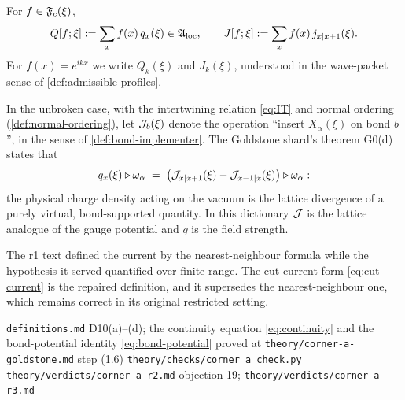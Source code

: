 \begin{definition}
\label{def:modulated-charge}
For $f \in \mathfrak{F}_{c}(\xi)$,
\begin{equation}
  Q[f;\xi] := \sum_{x} f(x) \, q_{x}(\xi) \in \mathfrak{A}_{\mathrm{loc}},
  \qquad
  J[f;\xi] := \sum_{x} f(x) \, j_{x|x+1}(\xi) .
\end{equation}
For $f(x) = e^{ikx}$ we write $Q_{k}(\xi)$ and $J_{k}(\xi)$, understood in the
wave-packet sense of \cref{def:admissible-profiles}.
\end{definition}

\begin{definition}
\label{def:bond-current-potential}
In the unbroken case, with the intertwining relation \eqref{eq:IT} and normal
ordering (\cref{def:normal-ordering}), let $\mathcal{J}_{b}(\xi)$ denote the
operation ``insert $X_{\alpha}(\xi)$ on bond $b$'', in the sense of
\cref{def:bond-implementer}. The Goldstone shard's theorem G0(d) states that
\begin{equation}
  q_{x}(\xi) \triangleright \omega_{\alpha}
  \;=\; \bigl( \mathcal{J}_{x|x+1}(\xi) - \mathcal{J}_{x-1|x}(\xi) \bigr)
        \triangleright \omega_{\alpha} :
  \label{eq:bond-potential}
\end{equation}
the physical charge density acting on the vacuum is the lattice divergence of a
purely virtual, bond-supported quantity. In this dictionary $\mathcal{J}$ is the
lattice analogue of the gauge potential and $q$ is the field strength.
\end{definition}

\begin{remark}
The r1 text defined the current by the nearest-neighbour formula while the
hypothesis it served quantified over finite range. The cut-current form
\eqref{eq:cut-current} is the repaired definition, and it supersedes the
nearest-neighbour one, which remains correct in its original restricted
setting.
\end{remark}

%
{\texttt{definitions.md} D10(a)--(d); the continuity equation
 \eqref{eq:continuity} and the bond-potential identity
 \eqref{eq:bond-potential} proved at
 \texttt{theory/corner-a-goldstone.md} step (1.6)}%
{\texttt{theory/checks/corner\_a\_check.py}}%
{\texttt{theory/verdicts/corner-a-r2.md} objection 19;
 \texttt{theory/verdicts/corner-a-r3.md}}
